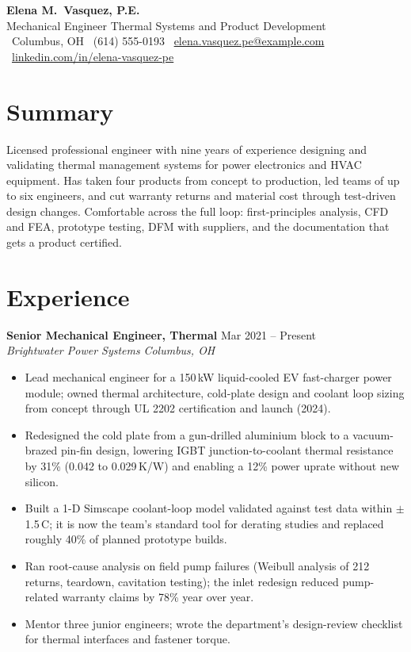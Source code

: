 \documentclass[11pt,letterpaper]{article}
\newcommand{\job}[4]{%
  \textbf{#1} \hfill {\color{muted}#2}\\
  \textit{#3} \hfill {\color{muted}\textit{#4}}\par\vspace{2pt}}
\begin{document}
\begin{center}
  {\Huge\bfseries Elena M.\ Vasquez, P.E.}\\[4pt]
  {\large\color{accent} Mechanical Engineer \textbullet{} Thermal Systems and Product Development}\\[6pt]
  \small
  \faMapMarker*\ Columbus, OH \quad
  \faPhone\ (614) 555-0193 \quad
  \faEnvelope\ \href{mailto:elena.vasquez.pe@example.com}{elena.vasquez.pe@example.com} \quad
  \faLinkedin\ \href{https://www.linkedin.com/in/elena-vasquez-pe}{linkedin.com/in/elena-vasquez-pe}
\end{center}

\section{Summary}
Licensed professional engineer with nine years of experience designing and validating thermal management systems for power electronics and HVAC equipment. Has taken four products from concept to production, led teams of up to six engineers, and cut warranty returns and material cost through test-driven design changes. Comfortable across the full loop: first-principles analysis, CFD and FEA, prototype testing, DFM with suppliers, and the documentation that gets a product certified.

\section{Experience}

\job{Senior Mechanical Engineer, Thermal}{Mar 2021 -- Present}
    {Brightwater Power Systems}{Columbus, OH}
\begin{itemize}
  \item Lead mechanical engineer for a 150\,kW liquid-cooled EV fast-charger power module; owned thermal architecture, cold-plate design and coolant loop sizing from concept through UL 2202 certification and launch (2024).
  \item Redesigned the cold plate from a gun-drilled aluminium block to a vacuum-brazed pin-fin design, lowering IGBT junction-to-coolant thermal resistance by 31\% (0.042 to 0.029\,K/W) and enabling a 12\% power uprate without new silicon.
  \item Built a 1-D Simscape coolant-loop model validated against test data within $\pm$1.5\,\textdegree C; it is now the team's standard tool for derating studies and replaced roughly 40\% of planned prototype builds.
  \item Ran root-cause analysis on field pump failures (Weibull analysis of 212 returns, teardown, cavitation testing); the inlet redesign reduced pump-related warranty claims by 78\% year over year.
  \item Mentor three junior engineers; wrote the department's design-review checklist for thermal interfaces and fastener torque.
\end{itemize}
\vspace{4pt}
\end{document}
